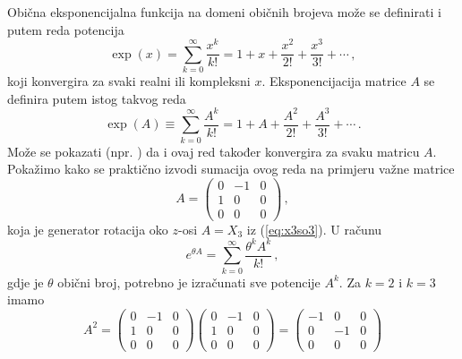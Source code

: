 Obična eksponencijalna funkcija na domeni običnih brojeva može se definirati
i putem reda potencija
\begin{equation}
    \exp(x) = \sum_{k = 0}^{\infty} \frac{x^k}{k!}
    = 1 + x + \frac{x^2}{2!} + \frac{x^3}{3!} + \cdots \,,
\end{equation}
koji konvergira za svaki realni ili kompleksni $x$.
Eksponencijacija matrice $A$ se definira putem istog takvog reda
\begin{equation}
    \exp(A) \equiv \sum_{k = 0}^{\infty} \frac{A^k}{k!}
    = 1 + A + \frac{A^2}{2!} + \frac{A^3}{3!} + \cdots \,.
\end{equation}
Može se pokazati (npr. \cite{Stilwell:2008}) da i ovaj
red također konvergira za svaku matricu $A$.
Pokažimo kako se praktično izvodi sumacija ovog reda na primjeru
važne matrice
\begin{equation}
    A = 
    \begin{pmatrix}
        0 & -1 & 0 \\
        1 &  0 & 0 \\
        0 &  0 & 0 
    \end{pmatrix} \,,
\end{equation}
koja je generator rotacija oko $z$-osi $A=X_3$ iz (\ref{eq:x3so3}).
U računu
\begin{equation}
    e^{\theta A} = \sum_{k = 0}^{\infty} \frac{\theta^k A^k}{k!} \,,
\end{equation}
gdje je $\theta$ obični broj, potrebno je izračunati sve potencije $A^k$.
Za $k=2$ i $k=3$ imamo
\begin{equation}
    A^2 = 
    \begin{pmatrix}
        0 & -1 & 0 \\
        1 &  0 & 0 \\
        0 &  0 & 0 
    \end{pmatrix}
    \begin{pmatrix}
        0 & -1 & 0 \\
        1 &  0 & 0 \\
        0 &  0 & 0 
    \end{pmatrix}  =
    \begin{pmatrix}
        -1 & 0 & 0 \\
         0 & -1 & 0 \\
        0 &  0 & 0 
    \end{pmatrix}
\end{equation}
